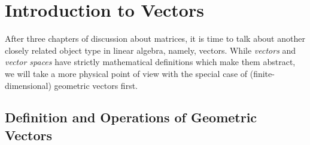 \chapter{Introduction to Vectors}

After three chapters of discussion about matrices, it is time to talk about another closely related object type in linear algebra, namely, vectors. While \textit{vectors} and \textit{vector spaces} have strictly mathematical definitions which make them abstract, we will take a more physical point of view with the special case of (finite-dimensional) geometric vectors first.

\section{Definition and Operations of Geometric Vectors}

